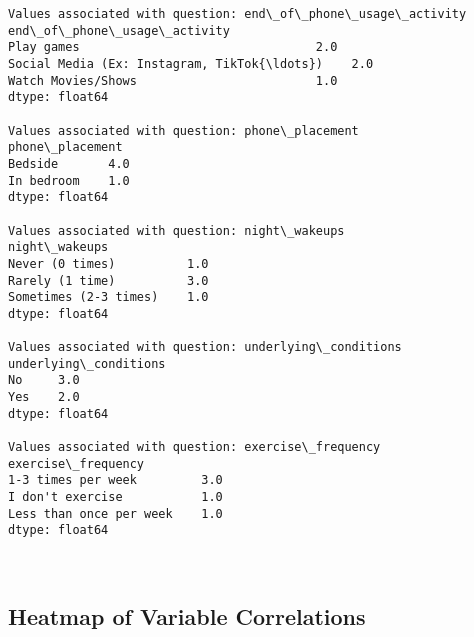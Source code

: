\documentclass[11pt]{article}
\begin{document}
    \begin{Verbatim}[commandchars=\\\{\}]
Values associated with question: end\_of\_phone\_usage\_activity
end\_of\_phone\_usage\_activity
Play games                                 2.0
Social Media (Ex: Instagram, TikTok{\ldots})    2.0
Watch Movies/Shows                         1.0
dtype: float64

Values associated with question: phone\_placement
phone\_placement
Bedside       4.0
In bedroom    1.0
dtype: float64

Values associated with question: night\_wakeups
night\_wakeups
Never (0 times)          1.0
Rarely (1 time)          3.0
Sometimes (2-3 times)    1.0
dtype: float64

Values associated with question: underlying\_conditions
underlying\_conditions
No     3.0
Yes    2.0
dtype: float64

Values associated with question: exercise\_frequency
exercise\_frequency
1-3 times per week         3.0
I don't exercise           1.0
Less than once per week    1.0
dtype: float64

    \end{Verbatim}

    \begin{center}
    \end{center}
    { \hspace*{\fill} \\}
    \newpage
    \hypertarget{heatmap-of-variable-correlations}{%
\subsection{Heatmap of Variable
Correlations}\label{heatmap-of-variable-correlations}}
\end{document}
